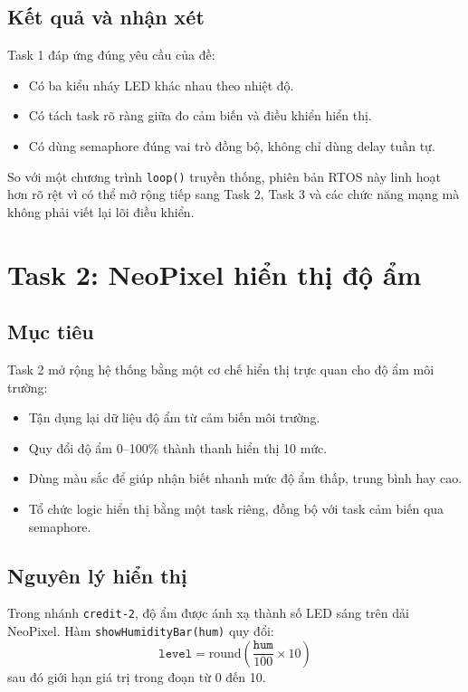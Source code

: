 \documentclass[12pt,a4paper]{article}
\begin{document}
\subsection{Kết quả và nhận xét}

Task 1 đáp ứng đúng yêu cầu của đề:
\begin{itemize}
  \item Có ba kiểu nháy LED khác nhau theo nhiệt độ.
  \item Có tách task rõ ràng giữa đo cảm biến và điều khiển hiển thị.
  \item Có dùng semaphore đúng vai trò đồng bộ, không chỉ dùng delay tuần tự.
\end{itemize}

So với một chương trình \texttt{loop()} truyền thống, phiên bản RTOS này linh hoạt hơn rõ rệt vì có thể mở rộng tiếp sang Task 2, Task 3 và các chức năng mạng mà không phải viết lại lõi điều khiển.

\section{Task 2: NeoPixel hiển thị độ ẩm}

\subsection{Mục tiêu}

Task 2 mở rộng hệ thống bằng một cơ chế hiển thị trực quan cho độ ẩm môi trường:
\begin{itemize}
  \item Tận dụng lại dữ liệu độ ẩm từ cảm biến môi trường.
  \item Quy đổi độ ẩm 0--100\% thành thanh hiển thị 10 mức.
  \item Dùng màu sắc để giúp nhận biết nhanh mức độ ẩm thấp, trung bình hay cao.
  \item Tổ chức logic hiển thị bằng một task riêng, đồng bộ với task cảm biến qua semaphore.
\end{itemize}

\subsection{Nguyên lý hiển thị}

Trong nhánh \texttt{credit-2}, độ ẩm được ánh xạ thành số LED sáng trên dải NeoPixel. Hàm \texttt{showHumidityBar(hum)} quy đổi:
\[
  \texttt{level} = \mathrm{round}\left(\frac{\texttt{hum}}{100} \times 10\right)
\]
sau đó giới hạn giá trị trong đoạn từ 0 đến 10.
\end{document}
